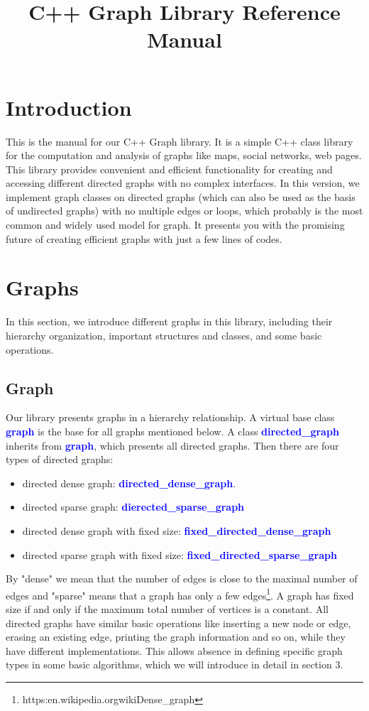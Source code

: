 \documentclass[]{article}
\title{C++ Graph Library Reference Manual}
\author{}
\begin{document}
\maketitle
\section{Introduction}
This is the manual for our C++ Graph library. It is a simple C++ class library for the computation and analysis of graphs like maps, social networks, web pages. This library provides convenient and efficient functionality for creating and accessing different directed graphs with no complex interfaces. In this version, we implement graph classes on directed graphs (which can also be used as the basis of undirected graphs) with no multiple edges or loops, which probably is the most common and widely used model for graph. It presents you with the promising future of creating efficient graphs with just a few lines of codes.

\section {Graphs}
In this section, we introduce different graphs in this library, including their hierarchy organization, important structures and classes, and some basic operations.
\subsection{Graph}
Our library presents graphs in a hierarchy relationship. A virtual base class \textbf{\textcolor{blue}{graph}} is the base for all graphs mentioned below. A class \textbf{\textcolor{blue}{directed\_graph}} inherits from \textbf{\textcolor{blue}{graph}}, which presents all directed graphs. Then there are four types of directed graphs:
\begin{itemize}
	\item directed dense graph: \textbf{\textcolor{blue}{directed\_dense\_graph}}.
	\item directed sparse graph: \textbf{\textcolor{blue}{dierected\_sparse\_graph}}
	\item directed dense graph with fixed size: \textbf{\textcolor{blue}{fixed\_directed\_dense\_graph}}
	\item directed sparse graph with fixed size: \textbf{\textcolor{blue}{fixed\_directed\_sparse\_graph}}
\end{itemize}
By "dense" we mean that the number of edges is close to the maximal number of edges and "sparse" means that a graph has only a few edges\footnote{https:\/\/en.wikipedia.org\/wiki\/Dense\_graph}. A graph has fixed size if and only if the maximum total number of vertices is a constant.
All directed graphs have similar basic operations like inserting a new node or edge, erasing an existing edge, printing the graph information and so on, while they have different implementations. This allows absence in defining specific graph types in some basic algorithms, which we will introduce in detail in section 3.
\end{document}
